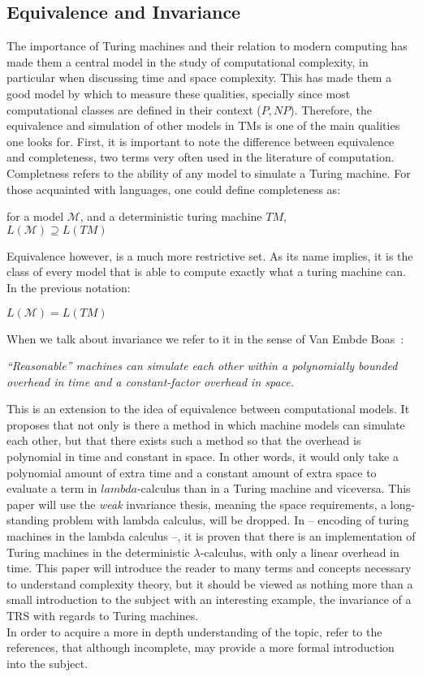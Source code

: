 \documentclass[12pt]{article}
\begin{document}
\subsection{Equivalence and Invariance}
The importance of Turing machines and their relation to modern computing has made them a central model in the study of computational complexity, in particular when discussing time and space complexity. This has made them a good model by which to measure these qualities, specially since most computational classes are defined in their context ($P, NP$). Therefore, the equivalence and simulation of other models in TMs is one of the main qualities one looks for.
First, it is important to note the difference between equivalence and completeness, two terms very often used in the literature of computation. Completness refers to the ability of any model to simulate a Turing machine. For those acquainted with languages, one could define completeness as:
\begin{center}
  for a model $\mathcal{M}$, and a deterministic turing machine $TM$, \\
  $L(\mathcal{M}) \supseteq L(TM)$
\end{center}
Equivalence however, is a much more restrictive set. As its name implies, it is the class of every model that is able to compute exactly what a turing machine can. In the previous notation:
\begin{center}
  $L(\mathcal{M}) = L(TM)$
\end{center}
When we talk about invariance we refer to it in the sense of Van Embde Boas~\cite{machine-models}: \\
\begin{center}
 \textit{\enquote{Reasonable} machines can simulate each other within a polynomially
bounded overhead in time and a constant-factor overhead in space.}
\end{center}
This is an extension to the idea of equivalence between computational models. It proposes that not only is there a method in which machine models can simulate each other, but that there exists such a method so that the overhead is polynomial in time and constant in space. In other words, it would only take a polynomial amount of extra time and a constant amount of extra space to evaluate a term in $lambda$-calculus than in a Turing machine and viceversa.
This paper will use the \textit{weak} invariance thesis, meaning the space requirements, a long-standing problem with lambda calculus, will be dropped.
In -- encoding of turing machines in the lambda calculus --, it is proven that there is an implementation of Turing machines in the deterministic $\lambda$-calculus, with only a linear overhead in time. This paper will introduce the reader to many terms and concepts necessary to understand complexity theory, but it should be viewed as nothing more than a small introduction to the subject with an interesting example, the invariance of a TRS with regards to Turing machines. \\
In order to acquire a more in depth understanding of the topic, refer to the references, that although incomplete, may provide a more formal introduction into the subject.
\end{document}
